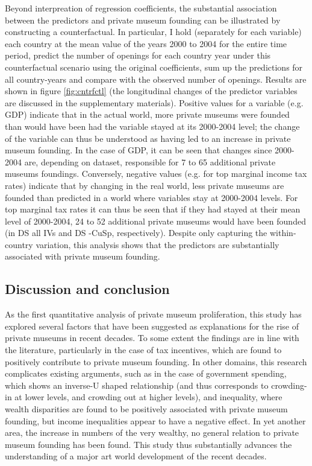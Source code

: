 \documentclass[11pt, authoryear]{elsarticle}
\begin{document}
Beyond interpreation of regression coefficients, the substantial association between the predictors and private museum founding can be illustrated by constructing a counterfactual.
In particular, I hold (separately for each variable) each country at the mean value of the years 2000 to 2004 for the entire time period, predict the number of openings for each country year under this counterfactual scenario using the original coefficients, sum up the predictions for all country-years and compare with the observed number of openings.
Results are shown in figure \ref{fig:cntrfctl} (the longitudinal changes of the predictor variables are discussed in the supplementary materials).
Positive values for a variable (e.g. GDP) indicate that in the actual world, more private museums were founded than would have been had the variable stayed at its 2000-2004 level; the change of the variable can thus be understood as having led to an increase in private museum founding.
In the case of GDP, it can be seen that changes since 2000-2004 are, depending on dataset, responsible for 7 to 65 additional private museums foundings.
Conversely, negative values (e.g. for top marginal income tax rates) indicate that by changing in the real world, less private museums are founded than predicted in a world where variables stay at 2000-2004 levels.
For top marginal tax rates it can thus be seen that if they had stayed at their mean level of 2000-2004, 24 to 52 additional private museums would have been founded (in DS all IVs and DS -CuSp, respectively).
Despite only capturing the within-country variation, this analysis shows that the predictors are substantially associated with private museum founding. 


\subsection*{Discussion and conclusion}

As the first quantitative analysis of private museum proliferation, this study has explored several factors that have been suggested as explanations for the rise of private museums in recent decades.
To some extent the findings are in line with the literature, particularly in the case of tax incentives, which are found to positively contribute to private museum founding.
In other domains, this research complicates existing arguments, such as in the case of government spending, which shows an inverse-U shaped relationship (and thus corresponds to crowding-in at lower levels, and crowding out at higher levels), and inequality, where wealth disparities are found to be positively associated with private museum founding, but income inequalities appear to have a negative effect. 
In yet another area, the increase in numbers of the very wealthy, no general relation to private museum founding has been found. 
This study thus substantially advances the understanding of a major art world development of the recent decades.
\end{document}
